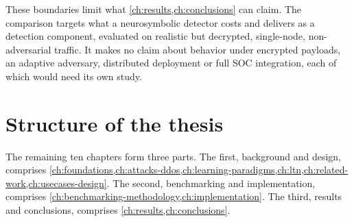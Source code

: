 These boundaries limit what \cref{ch:results,ch:conclusions} can claim. The
comparison targets what a neurosymbolic detector costs and delivers as a
detection component, evaluated on realistic but decrypted, single-node,
non-adversarial traffic. It makes no claim about behavior under encrypted
payloads, an adaptive adversary, distributed deployment or full SOC
integration, each of which would need its own study.

\section{Structure of the thesis}
\label{sec:thesis-structure}

The remaining ten chapters form three parts. The first, background and
design, comprises
\cref{ch:foundations,ch:attacks-ddos,ch:learning-paradigms,ch:ltn,ch:related-work,ch:usecases-design}.
The second, benchmarking and implementation, comprises
\cref{ch:benchmarking-methodology,ch:implementation}. The third, results and
conclusions, comprises \cref{ch:results,ch:conclusions}.

